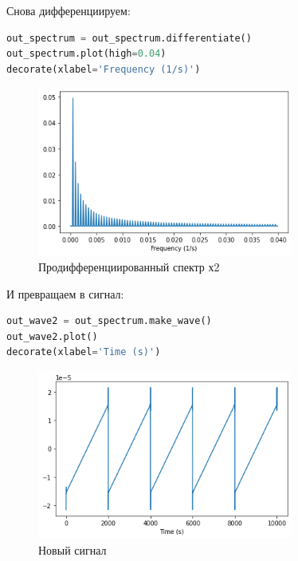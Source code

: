 \documentclass[a4paper,12pt]{report}
\begin{document}
    Снова дифференциируем:
    
\begin{lstlisting}[language=Python,caption=Продифференциированный спектр х2]
out_spectrum = out_spectrum.differentiate()
out_spectrum.plot(high=0.04)
decorate(xlabel='Frequency (1/s)')
\end{lstlisting}
    
    \begin{figure}[H]
        \centering
        \includegraphics[width=0.75\textwidth]{ex4_out_spectrum_more.png}
        \caption{Продифференциированный спектр х2}
        \label{fig:ex4_out_spectrum_more}
    \end{figure}

    И превращаем в сигнал:
    
\begin{lstlisting}[language=Python,caption=Новый сигнал]
out_wave2 = out_spectrum.make_wave()
out_wave2.plot()
decorate(xlabel='Time (s)')
\end{lstlisting}

    \begin{figure}[H]
        \centering
        \includegraphics[width=0.75\textwidth]{ex4_out_wave2.png}
        \caption{Новый сигнал}
        \label{fig:ex4_out_wave2}
    \end{figure}
\end{document}
